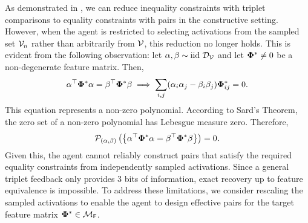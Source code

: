 As demonstrated in , we can reduce inequality constraints with triplet comparisons to equality constraints with pairs in the constructive setting. However, when the agent is restricted to selecting activations from the sampled set ${\mathcal{V}}_n$ rather than arbitrarily from ${\mathcal{V}}$, this reduction no longer holds. This is evident from the following observation: let $\alpha, \beta \sim \text{iid} \ {\mathcal{D}}_{{\mathcal{V}}}$ and let $\boldsymbol{\Phi}^* \neq 0$ be a non-degenerate feature matrix. Then,\vspace{-1.5mm}
\[
\alpha^{\top}\pphi^*\alpha = \beta^{\top}\pphi^*\beta \implies \sum_{i,j} (\alpha_i \alpha_j - \beta_i \beta_j) \pphi^*_{ij} = 0.\vspace{-1.5mm}
\]
This equation represents a non-zero polynomial. According to Sard's Theorem, the zero set of a non-zero polynomial has Lebesgue measure zero. Therefore,\vspace{-1.5mm}
\[
\cP_{(\alpha,\beta)}\left( \left\{ \alpha^{\top}\pphi^*\alpha = \beta^{\top}\pphi^*\beta \right\} \right) = 0.\vspace{-1mm}
\]
Given this, the agent cannot reliably construct pairs that satisfy the required equality constraints from independently sampled activations. Since a general triplet feedback only provides 3 bits of information, exact recovery up to feature equivalence is impossible. To address these limitations, we consider rescaling the sampled activations to enable the agent to design effective pairs for the target feature matrix $\boldsymbol{\Phi}^* \in {\mathcal{M}}_{\textsf{F}}$.


